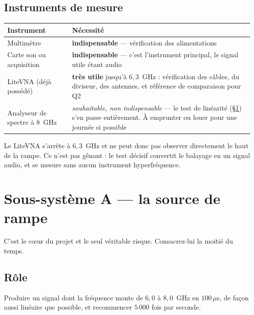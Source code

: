 \subsection{Instruments de mesure}

\begin{table}[H]
\centering
\begin{tabular}{>{\raggedright\arraybackslash}p{4.6cm}%
                >{\raggedright\arraybackslash}p{9.4cm}}
\toprule
Instrument & Nécessité \\
\midrule
Multimètre & \textbf{indispensable} --- vérification des alimentations \\
Carte son ou acquisition & \textbf{indispensable} --- c'est l'instrument
  principal, le signal utile étant audio \\
LiteVNA (déjà possédé) & \textbf{très utile} jusqu'à $6{,}3$~GHz : vérification
  des câbles, du diviseur, des antennes, et référence de comparaison pour Q2 \\
Analyseur de spectre à $8$~GHz & \emph{souhaitable, non indispensable} ---
  le test de linéarité (§\ref{sec:testA}) s'en passe entièrement. À emprunter
  ou louer pour une journée si possible \\
\bottomrule
\end{tabular}
\end{table}

\begin{attention}
Le LiteVNA s'arrête à $6{,}3$~GHz et ne peut donc pas observer directement le
haut de la rampe. Ce n'est pas gênant : le test décisif convertit le balayage
en un signal audio, et se mesure sans aucun instrument hyperfréquence.
\end{attention}

\section{Sous-système A --- la source de rampe}
\label{sec:testA}

C'est le c\oe ur du projet et le seul véritable risque. Consacrez-lui la moitié
du temps.

\subsection{Rôle}

Produire un signal dont la fréquence monte de $6{,}0$ à $8{,}0$~GHz en
$100\,\mu$s, de façon aussi linéaire que possible, et recommencer $5\,000$ fois
par seconde.

